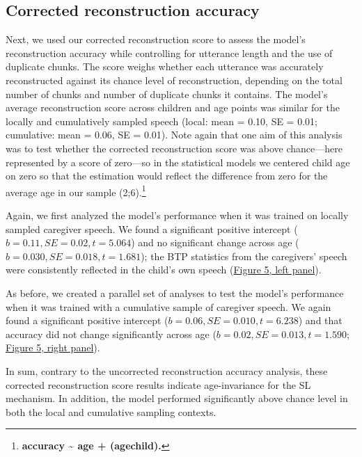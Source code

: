 \documentclass[man,mask,floatsintext]{apa6}
\let\rmarkdownfootnote\footnote%
\def\footnote{\protect\rmarkdownfootnote}
\begin{document}
\subsection{Corrected reconstruction
accuracy}\label{corrected-reconstruction-accuracy-1}

Next, we used our corrected reconstruction score to assess the model's
reconstruction accuracy while controlling for utterance length and the
use of duplicate chunks. The score weighs whether each utterance was
accurately reconstructed against its chance level of reconstruction,
depending on the total number of chunks and number of duplicate chunks
it contains. The model's average reconstruction score across children
and age points was similar for the locally and cumulatively sampled
speech (local: mean = 0.10, SE = 0.01; cumulative: mean = 0.06, SE =
0.01). Note again that one aim of this analysis was to test whether the
corrected reconstruction score was above chance---here represented by a
score of zero---so in the statistical models we centered child age on
zero so that the estimation would reflect the difference from zero for
the average age in our sample (2;6).\footnote{\textbf{accuracy
  \textasciitilde{} age + (age\textbar{}child).}}

Again, we first analyzed the model's performance when it was trained on
locally sampled caregiver speech. We found a significant positive
intercept (\(b = 0.11, SE = 0.02, t = 5.064\)) and no significant change
across age (\(b = 0.030, SE = 0.018, t = 1.681\)); the BTP statistics
from the caregivers' speech were consistently reflected in the child's
own speech (\protect\hyperlink{fig5}{Figure 5, left panel}).

As before, we created a parallel set of analyses to test the model's
performance when it was trained with a cumulative sample of caregiver
speech. We again found a significant positive intercept
(\(b= 0.06, SE = 0.010, t = 6.238\)) and that accuracy did not change
significantly across age (\(b=0.02, SE = 0.013, t = 1.590\);
\protect\hyperlink{fig5}{Figure 5, right panel}).

In sum, contrary to the uncorrected reconstruction accuracy analysis,
these corrected reconstruction score results indicate age-invariance for
the SL mechanism. In addition, the model performed significantly above
chance level in both the local and cumulative sampling contexts.
\end{document}
